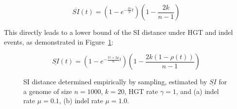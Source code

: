 \documentclass[9pt,english,utf8]{article}
\begin{document}
\begin{equation}
    \overline{SI}(t) = \left(1-e^{-\frac{3\gamma}{n}t}\right)
    \left(1-\frac{2k}{n-1}\right)
\end{equation}

This directly leads to a lower bound of the SI distance under HGT and indel
events, as demonstrated in Figure~\ref{fig:si_distance_hgtindel}:

\begin{equation}
    \underline{SI}(t) = \left(1-e^{-\frac{3\gamma+2\mu}{n}t}\right)
    \left(1-\frac{2k(1-\rho(t))}{n-1}\right)
\end{equation}

\begin{figure}[tb]
    \centering 
    \caption{SI distance determined empirically by sampling, estimated by 
    $\underline{SI}$ for a genome of size $n=1000$, $k=20$, HGT rate $\gamma=1$,
    and (a) indel rate $\mu=0.1$, (b) indel rate $\mu=1.0$.  }
    \label{fig:si_distance_hgtindel}
\end{figure}
\end{document}
